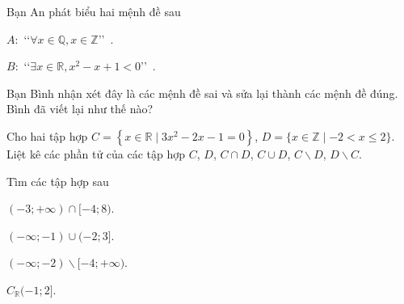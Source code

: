 

\begin{bt}%
	Bạn An phát biểu hai mệnh đề sau %
	\begin{enumEX}{2}
		\item  $A:$ \lq\lq $\forall x \in \mathbb{Q}, x \in \mathbb{Z} $\rq\rq~.%
		\item $B:$ \lq\lq$\exists x \in \mathbb{R}, x^2-x+1 < 0$\rq\rq~.
	\end{enumEX}
	Bạn Bình nhận xét đây là các mệnh đề sai và sửa lại thành các mệnh đề đúng. Bình đã viết lại như thế nào?
\end{bt}

\begin{bt}%
	Cho hai tập hợp $C=\left\{x \in \mathbb{R} \mid 3 x^2-2 x-1=0\right\}$, $D=\{x \in \mathbb{Z} \mid-2<x \leq 2\}$.\\
	Liệt kê các phần tử của các tập hợp $C$, $D$, $C \cap D$, $C \cup D$, $C \backslash D$, $D \backslash C$.        
\end{bt}

\begin{bt}%
	Tìm các tập hợp sau 
	\begin{enumEX}{2}
		\item $(-3 ;+\infty) \cap[-4 ; 8)$.
		\item $(-\infty ;-1) \cup(-2 ; 3]$.
		\item $(-\infty ;-2) \backslash[-4 ;+\infty)$.
		\item $C_{\mathbb{R}}(-1 ; 2]$.
	\end{enumEX}
	\loigiai{
		\begin{enumEX}{2}
			\item $(-3 ;+\infty) \cap[-4 ; 8) =(-3 ;8)$. 
			\item $(-\infty ;-1) \cup(-2 ; 3] = (-\infty;3]$.
			\item $(-\infty ;-2) \backslash[-4 ;+\infty)=(-\infty;-4)$.
			\item $C_{\mathbb{R}}(-1 ; 2] = (-\infty ;-1] \cup (2;+\infty)$.
		\end{enumEX}
	}
\end{bt}


